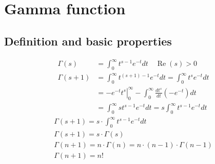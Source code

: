 

	\section{Gamma function}
	\subsection{Definition and basic properties}
	$$
	\begin{aligned}
		\Gamma(s) &=\int_0^{\infty} t^{s-1} e^{-t} d t \quad \operatorname{Re}(s)>0 \\
		\Gamma(s+1) &=\int_0^{\infty} t^{(s+1)-1} e^{-t} d t=\int_0^{\infty} t^s e^{-t} d t \\
		&=-\left.e^{-t} t^s\right|_0 ^{\infty}-\int_0^{\infty} \frac{d t^s}{d t}\left(-e^{-t}\right) d t \\
		&=\int_0^{\infty} s t^{s-1} e^{-t} d t=s \int_0^{\infty} t^{s-1} e^{-t} d t
	\end{aligned}
	$$
	$$
	\begin{gathered}
		\Gamma(s+1)=s \cdot \int_0^{\infty} t^{s-1} e^{-t} d t \\
		\Gamma(s+1)=s \cdot \Gamma(s) \\
		\Gamma(n+1)=n \cdot \Gamma(n)=n \cdot(n-1) \cdot \Gamma(n-1) \\
		\Gamma(n+1)=n !
	\end{gathered}
	$$
